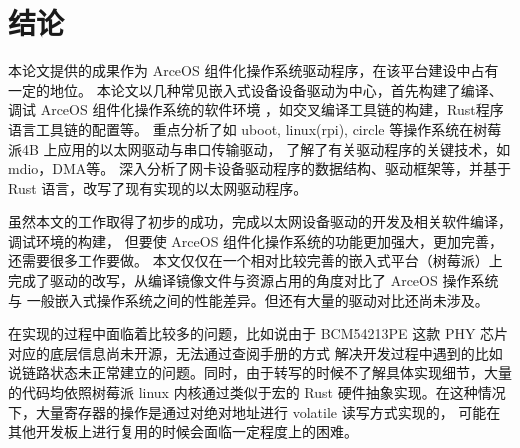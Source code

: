 \section{结论}

本论文提供的成果作为 ArceOS 组件化操作系统驱动程序，在该平台建设中占有一定的地位。
本论文以几种常见嵌入式设备设备驱动为中心，首先构建了编译、调试 ArceOS 组件化操作系统的软件环境
，如交叉编译工具链的构建，Rust程序语言工具链的配置等。
重点分析了如 uboot, linux(rpi), circle 等操作系统在树莓派4B 上应用的以太网驱动与串口传输驱动，
了解了有关驱动程序的关键技术，如mdio，DMA等。
深入分析了网卡设备驱动程序的数据结构、驱动框架等，并基于 Rust 语言，改写了现有实现的以太网驱动程序。

虽然本文的工作取得了初步的成功，完成以太网设备驱动的开发及相关软件编译，调试环境的构建，
但要使 ArceOS 组件化操作系统的功能更加强大，更加完善，还需要很多工作要做。
本文仅仅在一个相对比较完善的嵌入式平台（树莓派）上完成了驱动的改写，从编译镜像文件与资源占用的角度对比了 ArceOS 操作系统与
一般嵌入式操作系统之间的性能差异。但还有大量的驱动对比还尚未涉及。

在实现的过程中面临着比较多的问题，比如说由于 BCM54213PE 这款 PHY 芯片对应的底层信息尚未开源，无法通过查阅手册的方式
解决开发过程中遇到的比如说链路状态未正常建立的问题。同时，由于转写的时候不了解具体实现细节，大量的代码均依照树莓派 linux
内核通过类似于宏的 Rust 硬件抽象实现。在这种情况下，大量寄存器的操作是通过对绝对地址进行 volatile 读写方式实现的，
可能在其他开发板上进行复用的时候会面临一定程度上的困难。